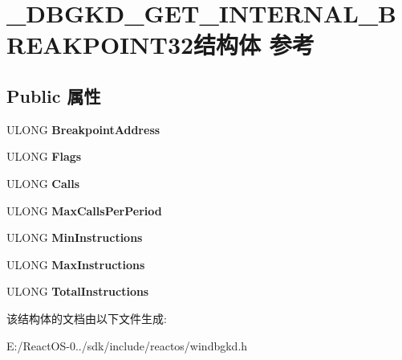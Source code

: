 \hypertarget{struct___d_b_g_k_d___g_e_t___i_n_t_e_r_n_a_l___b_r_e_a_k_p_o_i_n_t32}{}\section{\+\_\+\+D\+B\+G\+K\+D\+\_\+\+G\+E\+T\+\_\+\+I\+N\+T\+E\+R\+N\+A\+L\+\_\+\+B\+R\+E\+A\+K\+P\+O\+I\+N\+T32结构体 参考}
\label{struct___d_b_g_k_d___g_e_t___i_n_t_e_r_n_a_l___b_r_e_a_k_p_o_i_n_t32}
\subsection*{Public 属性}
\begin{DoxyCompactItemize}
\item 
\mbox{\label{struct___d_b_g_k_d___g_e_t___i_n_t_e_r_n_a_l___b_r_e_a_k_p_o_i_n_t32_a119ba62be569f4e8a8c4b934383737b2}} 
U\+L\+O\+NG {\bfseries Breakpoint\+Address}
\item 
\mbox{\label{struct___d_b_g_k_d___g_e_t___i_n_t_e_r_n_a_l___b_r_e_a_k_p_o_i_n_t32_aff73278a67071d6a2cc255abc6529300}} 
U\+L\+O\+NG {\bfseries Flags}
\item 
\mbox{\label{struct___d_b_g_k_d___g_e_t___i_n_t_e_r_n_a_l___b_r_e_a_k_p_o_i_n_t32_af14c531f08da81df9dca081369a43066}} 
U\+L\+O\+NG {\bfseries Calls}
\item 
\mbox{\label{struct___d_b_g_k_d___g_e_t___i_n_t_e_r_n_a_l___b_r_e_a_k_p_o_i_n_t32_a062f17e4cd940cc78d2a1ecf2bc2964f}} 
U\+L\+O\+NG {\bfseries Max\+Calls\+Per\+Period}
\item 
\mbox{\label{struct___d_b_g_k_d___g_e_t___i_n_t_e_r_n_a_l___b_r_e_a_k_p_o_i_n_t32_ae62f47d55723eb6722df717ddaf745d0}} 
U\+L\+O\+NG {\bfseries Min\+Instructions}
\item 
\mbox{\label{struct___d_b_g_k_d___g_e_t___i_n_t_e_r_n_a_l___b_r_e_a_k_p_o_i_n_t32_a20261949054d1c6c810ba50b067cc7a6}} 
U\+L\+O\+NG {\bfseries Max\+Instructions}
\item 
\mbox{\label{struct___d_b_g_k_d___g_e_t___i_n_t_e_r_n_a_l___b_r_e_a_k_p_o_i_n_t32_a40fed4ff4cd5cf2cd2c49c425fc9a7d9}} 
U\+L\+O\+NG {\bfseries Total\+Instructions}
\end{DoxyCompactItemize}


该结构体的文档由以下文件生成\+:\begin{DoxyCompactItemize}
\item 
E\+:/\+React\+O\+S-\/0../sdk/include/reactos/windbgkd.\+h\end{DoxyCompactItemize}
